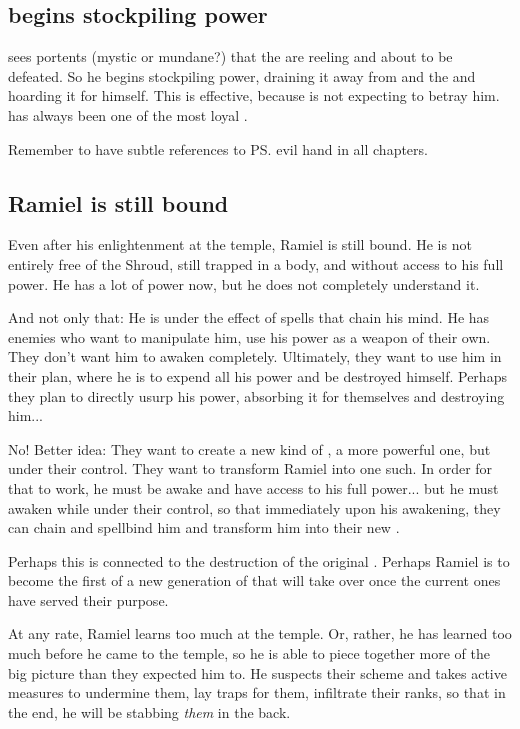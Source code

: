 \begin{garbage}
\subsection{\Azraid{} begins stockpiling \Erebean{} power}
\Azraid{} sees portents (mystic or mundane?) that the \banes{} are reeling and about to be defeated. So he begins stockpiling \Erebean{} power, draining it away from \Erebos{} and the \banelords{} and hoarding it for himself. This is effective, because \Daggerrain{} is not expecting \Azraid{} to betray him. \Azraid{} has always been one of the most loyal \resphain. 

Remember to have subtle references to \ps{\Azraid} evil hand in all \Azraid{} chapters. 







\subsection{Ramiel is still bound}
Even after his enlightenment at the \Mystraacht{} temple, Ramiel is still bound. He is not entirely free of the Shroud, still trapped in a \human{} body, and without access to his full \sathariah{} power. He has a lot of power now, but he does not completely understand it. 

And not only that: He is under the effect of spells that chain his mind. He has enemies who want to manipulate him, use his power as a weapon of their own. They don't want him to awaken completely. Ultimately, they want to use him in their plan, where he is to expend all his power and be destroyed himself. Perhaps they plan to directly usurp his power, absorbing it for themselves and destroying him...

No! Better idea: They want to create a new kind of \Sephirah, a more powerful one, but under their control. They want to transform Ramiel into one such. In order for that to work, he must be awake and have access to his full \sathariah{} power... but he must awaken while under their control, so that immediately upon his awakening, they can chain and spellbind him and transform him into their new \Sephirah. 

Perhaps this is connected to the destruction of the original \Sephiroth. Perhaps Ramiel is to become the first of a new generation of \Sephiroth{} that will take over once the current ones have served their purpose. 

At any rate, Ramiel learns too much at the temple. Or, rather, he has learned too much before he came to the temple, so he is able to piece together more of the big picture than they expected him to. He suspects their scheme and takes active measures to undermine them, lay traps for them, infiltrate their ranks, so that in the end, he will be stabbing \emph{them} in the back. 








\end{garbage}
